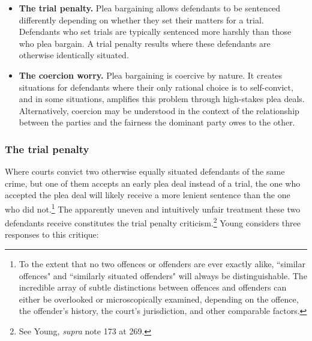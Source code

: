 \begin{itemize}
    \item \textbf{The trial penalty.} Plea bargaining allows defendants to be sentenced differently depending on whether they set their matters for a trial. Defendants who set trials are typically sentenced more harshly than those who plea bargain. A trial penalty results where these defendants are otherwise identically situated.
    \item \textbf{The coercion worry.} Plea bargaining is coercive by nature. It creates situations for defendants where their only rational choice is to self-convict, and in some situations, amplifies this problem through high-stakes plea deals. Alternatively, coercion may be understood in the context of the relationship between the parties and the fairness the dominant party owes to the other.
\end{itemize}

\subsubsection{The trial penalty}

Where courts convict two otherwise equally situated defendants of the same crime, but one of them accepts an early plea deal instead of a trial, the one who accepted the plea deal will likely receive a more lenient sentence than the one who did not.\footnote{To the extent that no two offences or offenders are ever exactly alike, ``similar offences" and ``similarly situated offenders" will always be distinguishable. The incredible array of subtle distinctions between offences and offenders can either be overlooked or microscopically examined, depending on the offence, the offender's history, the court's jurisdiction, and other comparable factors.} The apparently uneven and intuitively unfair treatment these two defendants receive constitutes the trial penalty criticism.\footnote{See Young, \textit{supra} note 173 at 269.} Young considers three responses to this critique:

